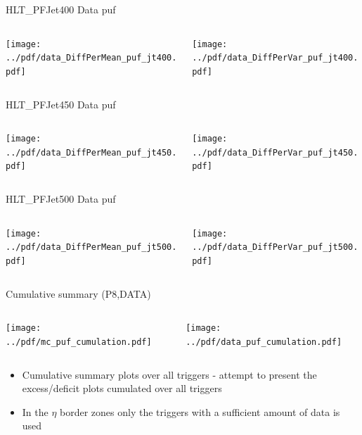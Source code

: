\documentclass[9pt]{beamer}
\begin{document}
\begin{frame}[t]{HLT\_PFJet400 Data puf}
\begin{columns}[T]
  \begin{column}{.5\textwidth}
  \texttt{[image: ../pdf/data\_DiffPerMean\_puf\_jt400.pdf]}
  \end{column}
  \begin{column}{.5\textwidth}
  \texttt{[image: ../pdf/data\_DiffPerVar\_puf\_jt400.pdf]}
  \end{column}
\end{columns}
\end{frame}

\begin{frame}[t]{HLT\_PFJet450 Data puf}
\begin{columns}[T]
  \begin{column}{.5\textwidth}
  \texttt{[image: ../pdf/data\_DiffPerMean\_puf\_jt450.pdf]}
  \end{column}
  \begin{column}{.5\textwidth}
  \texttt{[image: ../pdf/data\_DiffPerVar\_puf\_jt450.pdf]}
  \end{column}
\end{columns}
\end{frame}

\begin{frame}[t]{HLT\_PFJet500 Data puf}
\begin{columns}[T]
  \begin{column}{.5\textwidth}
  \texttt{[image: ../pdf/data\_DiffPerMean\_puf\_jt500.pdf]}
  \end{column}
  \begin{column}{.5\textwidth}
  \texttt{[image: ../pdf/data\_DiffPerVar\_puf\_jt500.pdf]}
  \end{column}
\end{columns}
\end{frame}

\begin{frame}[t]{Cumulative summary (P8,DATA)}
\begin{columns}[T]
  \begin{column}{.5\textwidth}
  \texttt{[image: ../pdf/mc\_puf\_cumulation.pdf]}
  \end{column}
  \begin{column}{.5\textwidth}
  \texttt{[image: ../pdf/data\_puf\_cumulation.pdf]}
  \end{column}
\end{columns}
\begin{itemize}
 \item Cumulative summary plots over all triggers - attempt to present the excess/deficit plots cumulated over all triggers
 \item In the $\eta$ border zones only the triggers with a sufficient amount of data is used
\end{itemize}
\end{frame}
\end{document}
